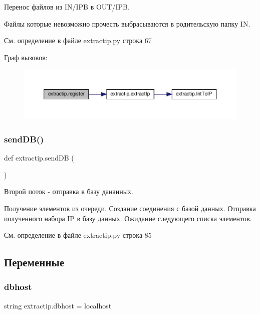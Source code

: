 Перенос файлов из I\+N/\+I\+PB в O\+U\+T/\+I\+PB. 

Файлы которые невозможно прочесть выбрасываются в родительскую папку IN. 

См. определение в файле extractip.\+py строка 67

Граф вызовов\+:\nopagebreak
\begin{figure}[H]
\begin{center}
\leavevmode
\includegraphics[width=350pt]{namespaceextractip_a93e2b267d1b4fe1cef5c09f3b66217c0_cgraph}
\end{center}
\end{figure}
\mbox{\label{namespaceextractip_a4eeaa038e0dc125d55e221ea90a5a466}} 
\subsubsection{\texorpdfstring{send\+D\+B()}{sendDB()}}
{\footnotesize\ttfamily def extractip.\+send\+DB (\begin{DoxyParamCaption}{ }\end{DoxyParamCaption})}



Второй поток -\/ отправка в базу дананных. 

Получение элементов из очереди. Создание соединения с базой данных. Отправка полученного набора IP в базу данных. Ожидание следующего списка элементов. 

См. определение в файле extractip.\+py строка 85



\subsection{Переменные}
\mbox{\label{namespaceextractip_ac577365c0a3822c9a30c2f72ecd62c18}} 
\subsubsection{\texorpdfstring{dbhost}{dbhost}}
{\footnotesize\ttfamily string extractip.\+dbhost = \textquotesingle{}localhost\textquotesingle{}}



